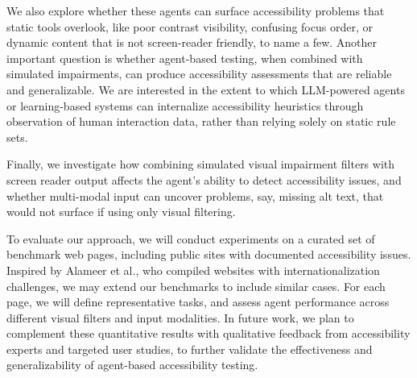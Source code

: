 We also explore whether these agents can surface accessibility problems that static tools overlook, like poor contrast visibility, confusing focus order, or dynamic content that is not screen-reader friendly, to name a few. Another important question is whether agent-based testing, when combined with simulated impairments, can produce accessibility assessments that are reliable and generalizable. We are interested in the extent to which LLM-powered agents or learning-based systems can internalize accessibility heuristics through observation of human interaction data, rather than relying solely on static rule sets.

Finally, we investigate how combining simulated visual impairment filters with screen reader output affects the agent's ability to detect accessibility issues, and whether multi-modal input can uncover problems, say, missing alt text, that would not surface if using only visual filtering.

To evaluate our approach, we will conduct experiments on a curated set of benchmark web pages, including public sites with documented accessibility issues. Inspired by Alameer et al.\cite{alameer2016detecting}, who compiled websites with internationalization challenges, we may extend our benchmarks to include similar cases. For each page, we will define representative tasks, and assess agent performance across different visual filters and input modalities. In future work, we plan to complement these quantitative results with qualitative feedback from accessibility experts and targeted user studies, to further validate the effectiveness and generalizability of agent-based accessibility testing.
